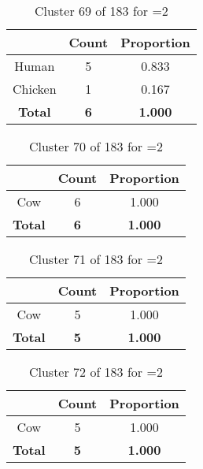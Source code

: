 \begin{table}[ht!]
\centering
\begin{tabular}{|c|c|c|}
\hline
\bf \Spec{} &\bf Count &\bf Proportion\\ \hline \hline
Human & 5 & 0.833\\ \hline
Chicken & 1 & 0.167\\ \hline
\hline
\bf Total & \bf 6 & \bf 1.000\\ \hline
\end{tabular}
\label{tab:cluster:69:2}
\caption{Cluster 69 of 183 for \minneigh{}=2}
\end{table}

\clearpage
\begin{table}[ht!]
\centering
\begin{tabular}{|c|c|c|}
\hline
\bf \Spec{} &\bf Count &\bf Proportion\\ \hline \hline
Cow & 6 & 1.000\\ \hline
\hline
\bf Total & \bf 6 & \bf 1.000\\ \hline
\end{tabular}
\label{tab:cluster:70:2}
\caption{Cluster 70 of 183 for \minneigh{}=2}
\end{table}

\begin{table}[ht!]
\centering
\begin{tabular}{|c|c|c|}
\hline
\bf \Spec{} &\bf Count &\bf Proportion\\ \hline \hline
Cow & 5 & 1.000\\ \hline
\hline
\bf Total & \bf 5 & \bf 1.000\\ \hline
\end{tabular}
\label{tab:cluster:71:2}
\caption{Cluster 71 of 183 for \minneigh{}=2}
\end{table}

\begin{table}[ht!]
\centering
\begin{tabular}{|c|c|c|}
\hline
\bf \Spec{} &\bf Count &\bf Proportion\\ \hline \hline
Cow & 5 & 1.000\\ \hline
\hline
\bf Total & \bf 5 & \bf 1.000\\ \hline
\end{tabular}
\label{tab:cluster:72:2}
\caption{Cluster 72 of 183 for \minneigh{}=2}
\end{table}

